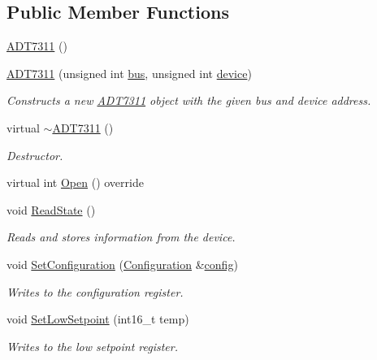 \subsection*{Public Member Functions}
\begin{DoxyCompactItemize}
\item 
\hyperlink{classcubesat_1_1ADT7311_a78925b45d39fe44bd7cf1fb706a6d5c1}{A\+D\+T7311} ()
\item 
\hyperlink{classcubesat_1_1ADT7311_ae20c3e2e7668a0b93494dd1e2fb89d8d}{A\+D\+T7311} (unsigned int \hyperlink{classcubesat_1_1SPIDevice_a4b4e91bed3762e7c7e4399fba3cb386d}{bus}, unsigned int \hyperlink{classcubesat_1_1SPIDevice_aa771ccb034a870a9188e63600fd4b40a}{device})
\begin{DoxyCompactList}\small\item\em Constructs a new \hyperlink{classcubesat_1_1ADT7311}{A\+D\+T7311} object with the given bus and device address. \end{DoxyCompactList}\item 
virtual \hyperlink{classcubesat_1_1ADT7311_a2f45a357a557098fcf9d72b6087e731c}{$\sim$\+A\+D\+T7311} ()
\begin{DoxyCompactList}\small\item\em Destructor. \end{DoxyCompactList}\item 
virtual int \hyperlink{classcubesat_1_1ADT7311_ac8ddceb62b008effe3f4521bbbe154f7}{Open} () override
\item 
void \hyperlink{classcubesat_1_1ADT7311_a30816e820813a843a945583572676c13}{Read\+State} ()
\begin{DoxyCompactList}\small\item\em Reads and stores information from the device. \end{DoxyCompactList}\item 
void \hyperlink{classcubesat_1_1ADT7311_adaafd79f27e3929eeba00c0a185d5b32}{Set\+Configuration} (\hyperlink{unioncubesat_1_1ADT7311_1_1Configuration}{Configuration} \&\hyperlink{classcubesat_1_1ADT7311_aa14e2538b100b5427358cf21fff183e6}{config})
\begin{DoxyCompactList}\small\item\em Writes to the configuration register. \end{DoxyCompactList}\item 
void \hyperlink{classcubesat_1_1ADT7311_a52ef57ca7df4c0f53ed0f98be1c1defd}{Set\+Low\+Setpoint} (int16\+\_\+t temp)
\begin{DoxyCompactList}\small\item\em Writes to the low setpoint register. \end{DoxyCompactList}\item 

\end{DoxyCompactItemize}
